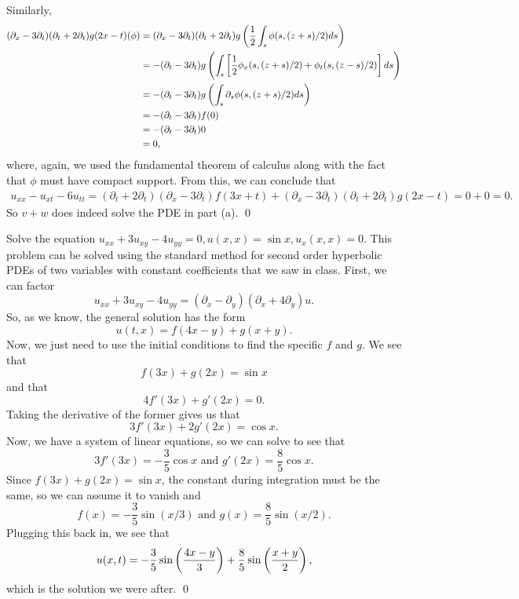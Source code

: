 \documentclass{article}
\renewcommand{\d}{\partial}
\begin{document}
\begin{enumerate}[(a)]
    \hop 
    Similarly,
    \begin{align*}
        (\d_x - 3\d_t)(\d_t + 2\d_t)g(2x - t)(\phi) &= (\d_x - 3\d_t)(\d_t + 2\d_t)g\del{\frac{1}{2}\int_s \phi(s, (z+s)/2)ds} \\
        &=-(\d_t - 3\d_t)g\del{\int_s \sbr{\frac{1}{2}\phi_x(s, (z+s)/2) + \phi_t(s, (z-s)/2)}ds}\\
        &= -(\d_t - 3\d_t)g\del{\int_s \d_s \phi(s, (z+s)/2)ds} \\
        &= -(\d_t - 3\d_t)f(0)\\
        &= -(\d_t -3\d_t)0\\
        &=0,
    \end{align*}
    where, again, we used the fundamental theorem of calculus along with the fact that $\phi$ must have compact support. 
    \hop 
    From this, we can conclude that 
    \begin{align*}
        u_{xx}-u_{xt}-6u_{tt} = (\d_t + 2\d_t)(\d_x - 3\d_t)f(3x + t) +  (\d_x - 3\d_t)(\d_t + 2\d_t)g(2x-t) = 0+0 = 0.
    \end{align*}
    So $v+w$ does indeed solve the PDE in part (a). \qed
\end{enumerate}


\newpage
{} Solve the equation $u_{xx} + 3u_{xy} - 4u_{yy} = 0, u(x,x) = \sin x, u_x(x,x) = 0$. \tri
\hop
\solution This problem can be solved using the standard method for second order hyperbolic PDEs of two variables with constant coefficients that we saw in class. 
\hop 
First, we can factor 
\[u_{xx} + 3u_{xy} -4u_{yy} = (\d_x - \d_y)(\d_x + 4\d_y)u.\]
So, as we know, the general solution has the form 
\[u(t,x) = f(4x - y)+ g(x+y).\]
Now, we just need to use the initial conditions to find the specific $f$ and $g$. We see that 
\[f(3x)+g(2x) = \sin x\]
and that 
\[4f'(3x) + g'(2x) = 0.\]
Taking the derivative of the former gives us that 
\[3f'(3x)+2g'(2x) = \cos x.\]
Now, we have a system of linear equations, so we can solve to see that 
\[3f'(3x) = - \frac{3}{5}\cos x \text{ and } g'(2x) = \frac{8}{5} \cos x .\]
Since $f(3x) + g(2x) = \sin x$, the constant during integration must be the same, so we can assume it to vanish and
\[f(x) = -\frac{3}{5}\sin(x/3) \text{ and } g(x) = \frac{8}{5}\sin(x/2).\]
Plugging this back in, we see that 
\[u(x,t) =  -\frac{3}{5}\sin\del{\frac{4x-y}{3}} + \frac{8}{5}\sin\del{\frac{x+y}{2}},\]
which is the solution we were after. \qed
\end{document}
